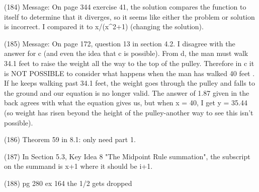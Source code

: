 {(184)  Message: On page 344 exercise 41, the solution compares the function to itself to determine that it diverges, so it seems like either the problem or solution is incorrect. I compared it to x/(x^2+1) (changing the solution).

(185)  Message: On page 172, question 13 in section 4.2. I disagree with the answer for c (and even the idea that c is possible). From d, the man must walk 34.1 feet to raise the weight all the way to the top of the pulley. Therefore in c it is NOT POSSIBLE to consider what happens when the man has walked 40 feet . If he keeps walking past 34.1 feet, the weight goes through the pulley and falls to the ground and our equation is no longer valid. The answer of 1.87 given in the back agrees with what the equation gives us, but when x = 40, I get y = 35.44 (so weight has risen beyond the height of the pulley-another way to see this isn't possible).

(186)  Theorem 59 in 8.1: only need part 1.
%


(187)  In Section 5.3, Key Idea 8 "The Midpoint Rule summation", the subscript on the summand is {x+1} where it should be {i+1}.

(188)  pg 280 ex 164 the 1/2 gets dropped

}
